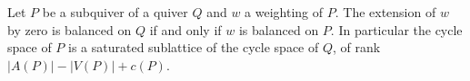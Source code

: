 \begin{theorem}\label{Arden24v2-thm-5.1}
\label{Arden24v2-thm:subquiver}
Let $P$ be a subquiver of a quiver $Q$ and $w$ a weighting of $P$. The extension of $w$ by zero is balanced on $Q$ if and only if $w$ is balanced on $P$. In particular the cycle space of $P$ is a saturated sublattice of the cycle space of $Q$, of rank $|A(P)| - |V(P)| + c(P)$.
\end{theorem}